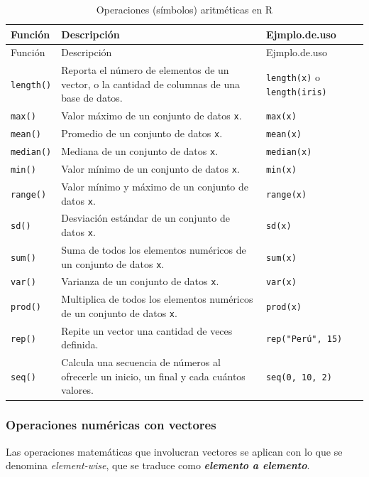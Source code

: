 \documentclass[
]{article}
\theoremstyle{definition}
\theoremstyle{definition}
\theoremstyle{definition}
\theoremstyle{definition}
\theoremstyle{remark}
\begin{document}
\begin{longtable}[]{@{}lll@{}}
\caption{\label{tab:unnamed-chunk-8}Operaciones (símbolos) aritméticas en R}\tabularnewline
\toprule()
Función & Descripción & Ejmplo.de.uso \\
\midrule()
\endfirsthead
\toprule()
Función & Descripción & Ejmplo.de.uso \\
\midrule()
\endhead
\texttt{length()} & Reporta el número de elementos de un vector, o la cantidad de columnas de una base de datos. & \texttt{length(x)} o \texttt{length(iris)} \\
\texttt{max()} & Valor máximo de un conjunto de datos \texttt{x}. & \texttt{max(x)} \\
\texttt{mean()} & Promedio de un conjunto de datos \texttt{x}. & \texttt{mean(x)} \\
\texttt{median()} & Mediana de un conjunto de datos \texttt{x}. & \texttt{median(x)} \\
\texttt{min()} & Valor mínimo de un conjunto de datos \texttt{x}. & \texttt{min(x)} \\
\texttt{range()} & Valor mínimo y máximo de un conjunto de datos \texttt{x}. & \texttt{range(x)} \\
\texttt{sd()} & Desviación estándar de un conjunto de datos \texttt{x}. & \texttt{sd(x)} \\
\texttt{sum()} & Suma de todos los elementos numéricos de un conjunto de datos \texttt{x}. & \texttt{sum(x)} \\
\texttt{var()} & Varianza de un conjunto de datos \texttt{x}. & \texttt{var(x)} \\
\texttt{prod()} & Multiplica de todos los elementos numéricos de un conjunto de datos \texttt{x}. & \texttt{prod(x)} \\
\texttt{rep()} & Repite un vector una cantidad de veces definida. & \texttt{rep("Perú",\ 15)} \\
\texttt{seq()} & Calcula una secuencia de números al ofrecerle un inicio, un final y cada cuántos valores. & \texttt{seq(0,\ 10,\ 2)} \\
\bottomrule()
\end{longtable}

\hypertarget{operaciones-numuxe9ricas-con-vectores}{%
\subsubsection{Operaciones numéricas con vectores}\label{operaciones-numuxe9ricas-con-vectores}}

Las operaciones matemáticas que involucran vectores se aplican con lo que se denomina \emph{element-wise}, que se traduce como \emph{\textbf{elemento a elemento}}.
\end{document}
